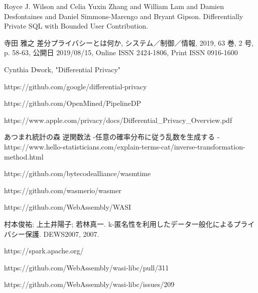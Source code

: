 \documentclass[a4paper,11pt]{jreport}
\begin{document}
\begin{thebibliography}{1}
    Royce J. Wilson and
    Celia Yuxin Zhang and
    William Lam and
    Damien Desfontaines and
    Daniel Simmons-Marengo and
    Bryant Gipson.
    \newblock Differentially Private SQL with Bounded User Contribution.

    寺田 雅之
    \newblock  差分プライバシーとは何か, システム／制御／情報, 2019, 63 巻, 2 号, p. 58-63, 公開日 2019/08/15, Online ISSN 2424-1806, Print ISSN 0916-1600

    Cynthia Dwork, "Differential Privacy"

    https://github.com/google/differential-privacy

    https://github.com/OpenMined/PipelineDP

    \newblock https://www.apple.com/privacy/docs/Differential\_Privacy\_Overview.pdf

    あつまれ統計の森
    \newblock 逆関数法 -任意の確率分布に従う乱数を生成する
     - https://www.hello-statisticians.com/explain-terms-cat/inverse-transformation-method.html

    https://github.com/bytecodealliance/wasmtime

    https://github.com/wasmerio/wasmer

    https://github.com/WebAssembly/WASI

    村本俊祐; 上土井陽子; 若林真一. k-匿名性を利用したデータ一般化によるプライバシー保護. DEWS2007, 2007.

    https://spark.apache.org/

    https://github.com/WebAssembly/wasi-libc/pull/311

    https://github.com/WebAssembly/wasi-libc/issues/209

\end{thebibliography}

\end{document}
